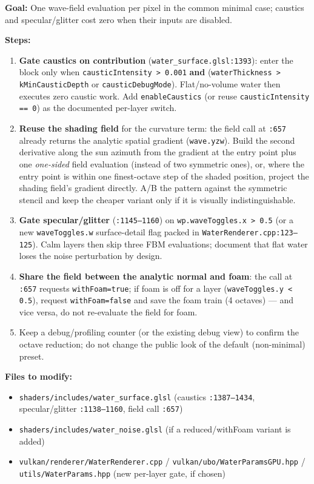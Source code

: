\documentclass[11pt,a4paper]{article}
\begin{document}
\begin{tcolorbox}[promptbox={Prompt: Evaluate the Wave Field Once and Gate the Optional Noise}]
\textbf{Goal:} One wave-field evaluation per pixel in the common minimal case; caustics and specular/glitter cost zero when their inputs are disabled.

\textbf{Steps:}
\begin{enumerate}
    \item \textbf{Gate caustics on contribution} (\texttt{water\_surface.glsl:1393}): enter the block only when
    \texttt{causticIntensity > 0.001} \textbf{and} (\texttt{waterThickness > kMinCausticDepth} or \texttt{causticDebugMode}). Flat/no-volume water then executes zero caustic
    work. Add \texttt{enableCaustics} (or reuse \texttt{causticIntensity == 0}) as the documented per-layer switch.
    \item \textbf{Reuse the shading field} for the curvature term: the field call at \texttt{:657} already returns the analytic spatial gradient (\texttt{wave.yzw}). Build the
    second derivative along the sun azimuth from the gradient at the entry point plus one \emph{one-sided} field evaluation (instead of two symmetric ones), or, where the entry
    point is within one finest-octave step of the shaded position, project the shading field's gradient directly. A/B the pattern against the symmetric stencil and keep the
    cheaper variant only if it is visually indistinguishable.
    \item \textbf{Gate specular/glitter} (\texttt{:1145--1160}) on \texttt{wp.waveToggles.x > 0.5} (or a new \texttt{waveToggles.w} surface-detail flag packed in
    \texttt{WaterRenderer.cpp:123--125}). Calm layers then skip three FBM evaluations; document that flat water loses the noise perturbation by design.
    \item \textbf{Share the field between the analytic normal and foam}: the call at \texttt{:657} requests \texttt{withFoam=true}; if foam is off for a layer
    (\texttt{waveToggles.y < 0.5}), request \texttt{withFoam=false} and save the foam train (4 octaves) --- and vice versa, do not re-evaluate the field for foam.
    \item Keep a debug/profiling counter (or the existing debug view) to confirm the octave reduction; do not change the public look of the default (non-minimal) preset.
\end{enumerate}

\textbf{Files to modify:}
\begin{itemize}
    \item \texttt{shaders/includes/water\_surface.glsl} (caustics \texttt{:1387--1434}, specular/glitter \texttt{:1138--1160}, field call \texttt{:657})
    \item \texttt{shaders/includes/water\_noise.glsl} (if a reduced/withFoam variant is added)
    \item \texttt{vulkan/renderer/WaterRenderer.cpp} / \texttt{vulkan/ubo/WaterParamsGPU.hpp} / \texttt{utils/WaterParams.hpp} (new per-layer gate, if chosen)
\end{itemize}


\end{tcolorbox}
\end{document}
